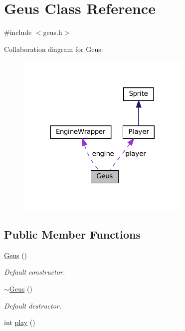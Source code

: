 \hypertarget{classGeus}{}\section{Geus Class Reference}
\label{classGeus}


{\ttfamily \#include $<$geus.\+h$>$}



Collaboration diagram for Geus\+:
\nopagebreak
\begin{figure}[H]
\begin{center}
\leavevmode
\includegraphics[width=236pt]{classGeus__coll__graph}
\end{center}
\end{figure}
\subsection*{Public Member Functions}
\begin{DoxyCompactItemize}
\item 
\hyperlink{classGeus_a21852cfcb9229ce95773f15cf1e8620e}{Geus} ()
\begin{DoxyCompactList}\small\item\em Default constructor. \end{DoxyCompactList}\item 
\hyperlink{classGeus_ac6a5d703343da401f4af4c9eb89a5ae8}{$\sim$\+Geus} ()
\begin{DoxyCompactList}\small\item\em Default destructor. \end{DoxyCompactList}\item 
int \hyperlink{classGeus_af62245e002ed29f52e4ffff6372f4da9}{play} ()
\end{DoxyCompactItemize}
